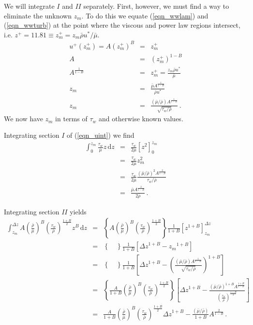 We will integrate $I$ and $II$ separately.  First, however, we must find a way to eliminate the unknown $z_m$.  To do this we equate (\ref{eqn_wwlam}) and (\ref{eqn_wwturb}) at the point where the viscous and power law regions intersect, i.e. $z^+ = 11.81 \equiv z_m^+ = z_m \bar{\rho}u^*/\bar{\mu}$.
\begin{eqnarray}
\label{eqn_derivezm}
u^+(z_m^+) = A(z_m^+)^B &=& z_m^+ \nonumber\\
A &=& (z_m^+)^{1-B} \nonumber\\
A^{\frac{1}{1-B}} &=& z_m^+ = \frac{z_m\bar{\rho}u^*}{\bar{\mu}} \nonumber\\
z_m &=& \frac{\bar{\mu}A^{\frac{1}{1-B}}}{\bar{\rho}u^*} \nonumber\\
z_m &=& \frac{(\bar{\mu}/\bar{\rho})A^{\frac{1}{1-B}}}{\sqrt{\tau_w/\bar{\rho}}} \,\mbox{.}
\end{eqnarray}
We now have $z_m$ in terms of $\tau_w$ and otherwise known values.

Integrating section $I$ of (\ref{eqn_uint}) we find
\begin{eqnarray}
\label{eqn_intI}
\int_0^{z_m} \frac{\tau_w}{\bar{\mu}} z\,\mbox{d}z &=& \frac{\tau_w}{2\bar{\mu}} \left[ z^2 \right]_0^{z_m} \nonumber\\
&=& \frac{\tau_w}{2\bar{\mu}} z_m^2 \nonumber\\
&=& \frac{\tau_w}{2\bar{\mu}} \frac{(\bar{\mu}/\bar{\rho})^2A^{\frac{2}{1-B}}}{\tau_w/\bar{\rho}} \nonumber\\
&=& \frac{\bar{\mu} A^{\frac{2}{1-B}}}{2\bar{\rho}} \,\mbox{.}
\end{eqnarray}

Integrating section $II$ yields
\begin{eqnarray}
\label{eqn_intII}
\int_{z_m}^{\Delta z} A\left(\frac{\bar{\rho}}{\bar{\mu}}\right)^B \left(\frac{\tau_w}{\bar{\rho}}\right)^{\frac{1+B}{2}} z^B\,\mbox{d}z &=& \left\{A\left(\frac{\bar{\rho}}{\bar{\mu}}\right)^B \left(\frac{\tau_w}{\bar{\rho}}\right)^{\frac{1+B}{2}}\right\} \frac{1}{1+B} \left[z^{1+B}\right]_{z_m}^{\Delta z} \nonumber\\
&=& \left\{ \quad \right\} \frac{1}{1+B} \left[{\Delta z}^{1+B} - {z_m}^{1+B}\right] \nonumber\\
&=& \left\{ \quad \right\} \frac{1}{1+B} \left[{\Delta z}^{1+B} - \left(\frac{(\bar{\mu}/\bar{\rho})A^{\frac{1}{1-B}}}{\sqrt{\tau_w/\bar{\rho}}}\right)^{1+B}\right] \nonumber\\
&=& \left\{ \frac{A}{1+B} \left(\frac{\bar{\rho}}{\bar{\mu}}\right)^B \left(\frac{\tau_w}{\bar{\rho}}\right)^{\frac{1+B}{2}} \right\} \left[{\Delta z}^{1+B} - \frac{(\bar{\mu}/\bar{\rho})^{1+B} A^{\frac{1+B}{1-B}}}{\left(\frac{\tau_w}{\bar{\rho}}\right)^{\frac{1+B}{2}}}\right] \nonumber\\
&=& \frac{A}{1+B} \left(\frac{\bar{\rho}}{\bar{\mu}}\right)^B \left(\frac{\tau_w}{\bar{\rho}}\right)^{\frac{1+B}{2}} {\Delta z}^{1+B} - \frac{(\bar{\mu}/\bar{\rho})}{1+B} A^{\frac{2}{1-B}} \,\mbox{.}
\end{eqnarray}

